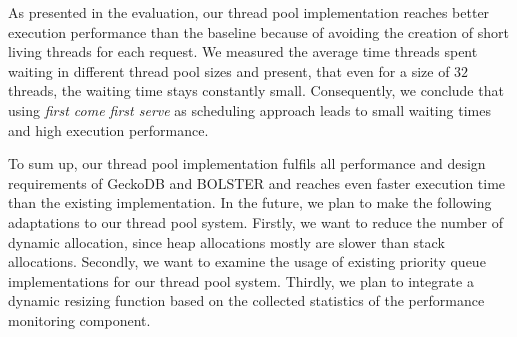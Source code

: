 \documentclass[conference]{IEEEtran}
\begin{document}
As presented in the evaluation, our thread pool implementation reaches better execution performance than the baseline because of avoiding the creation of short living threads for each request. We measured the average time threads spent waiting in different thread pool sizes and present, that even for a size of $32$ threads, the waiting time stays constantly small. Consequently, we conclude that using \emph{first come first serve} as scheduling approach leads to small waiting times and high execution performance. 

To sum up, our thread pool implementation fulfils all performance and design requirements of GeckoDB and BOLSTER and reaches even faster execution time than the existing implementation. In the future, we plan to make the following adaptations to our thread pool system. Firstly, we want to reduce the number of dynamic allocation, since heap allocations mostly are slower than stack allocations. Secondly, we want to examine the usage of existing priority queue implementations for our thread pool system. Thirdly, we plan to integrate a dynamic resizing function based on the collected statistics of the performance monitoring component. 



\end{document}
